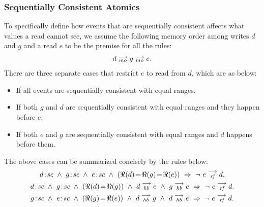         \subsubsection{Sequentially Consistent Atomics} 
            To specifically define how events that are sequentially consistent affects what values a read cannot see, we assume the following memory order among writes $d$ and $g$ and a read $e$ to be the premise for all the rules: 
                \begin{align*}
                    d \stackrel{\longrightarrow}{_{mo}} g \stackrel{\longrightarrow}{_{mo}} e.
                \end{align*}
            There are three separate cases that restrict $e$ to read from $d$, which are as below:
            \begin{itemize}
                \item If all events are sequentially consistent with equal ranges.
                \item If both $g$ and $d$ are sequentially consistent with equal ranges and they happen before $e$.
                \item If both $e$ and $g$ are sequentially consistent with equal ranges and $d$ happens before them. 
            \end{itemize}
            The above cases can be summarized concisely by the rules below:
                \begin{gather*}
                        \et{d}{sc}\ \wedge\ \et{g}{sc}\ \wedge\ \et{e}{sc} 
                        \ \wedge \ (\Re(d) \!=\! \Re(g) \!=\! \Re(e))
                        \ \Rightarrow{} \ 
                        \neg \ \reln{e}{rf}{d}.
                    \\    
                        \et{d}{sc}\ \wedge\ \et{g}{sc}  
                        \ \wedge \ (\Re(d) \!=\! \Re(g)) 
                        \ \wedge \ \reln{d}{hb}{e}
                        \ \wedge \ \reln{g}{hb}{e}
                        \ \Rightarrow{}\  
                        \neg \ \reln{e}{rf}{d}.
                    \\
                        \et{g}{sc}\ \wedge\ \et{e}{sc}  
                        \ \wedge \ (\Re(g) \!= \!\Re(e)) 
                        \ \wedge \ \reln{d}{hb}{g} 
                        \ \wedge \ \reln{d}{hb}{e}
                        \ \Rightarrow \ 
                        \neg \ \reln{e}{rf}{d}.
                \end{gather*}
  